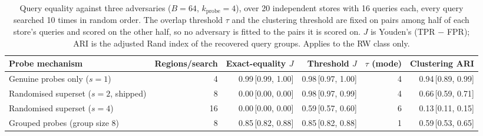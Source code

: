 \begin{table}[t]
\centering
\caption{Query equality against three adversaries ($B=64$, $k_{\mathrm{probe}}=4$), over 20 independent stores with 16 queries each, every query searched 10 times in random order. The overlap threshold $\tau$ and the clustering threshold are fixed on pairs among half of each store's queries and scored on the other half, so no adversary is fitted to the pairs it is scored on. $J$ is Youden's (TPR $-$ FPR); ARI is the adjusted Rand index of the recovered query groups. Applies to the RW class only.}
\label{tab:supp-e15}
\small
\setlength{\tabcolsep}{4pt}
\begin{tabular}{lrrrrr}
\toprule
Probe mechanism & Regions/search & Exact-equality $J$ & Threshold $J$ & $\tau$ (mode) & Clustering ARI \\
\midrule
Genuine probes only ($s=1$) & 4 & 0.99\,[0.99, 1.00] & 0.98\,[0.97, 1.00] & 4 & 0.94\,[0.89, 0.99] \\
Randomised superset ($s=2$, shipped) & 8 & 0.00\,[0.00, 0.00] & 0.98\,[0.97, 0.99] & 4 & 0.66\,[0.59, 0.71] \\
Randomised superset ($s=4$) & 16 & 0.00\,[0.00, 0.00] & 0.59\,[0.57, 0.60] & 6 & 0.13\,[0.11, 0.15] \\
Grouped probes (group size 8) & 8 & 0.85\,[0.82, 0.88] & 0.85\,[0.82, 0.88] & 1 & 0.59\,[0.53, 0.65] \\
\bottomrule
\end{tabular}
\end{table}
